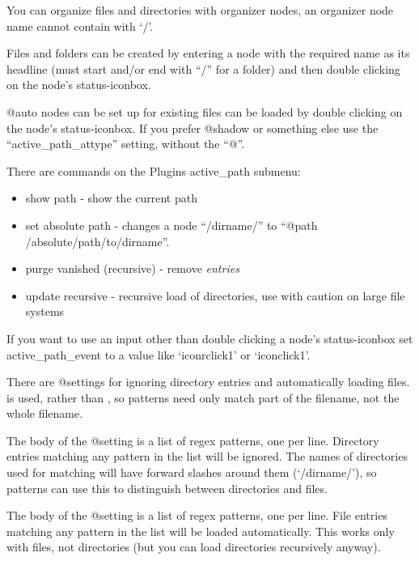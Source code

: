 \documentclass[a4paper,10pt,english]{sphinxmanual}
\begin{document}
You can organize files and directories with organizer nodes, an organizer node
name cannot contain with `/'.

Files and folders can be created by entering a node with the required name as
its headline (must start and/or end with ``/'' for a folder) and then double
clicking on the node's status-iconbox.

@auto nodes can be set up for existing files can be loaded by
double clicking on the node's status-iconbox. If you prefer
@shadow or something else use the ``active\_path\_attype'' setting,
without the ``@''.

There are commands on the Plugins active\_path submenu:
\begin{itemize}
\item {} 
show path - show the current path

\item {} 
set absolute path - changes a node ``/dirname/'' to ``@path /absolute/path/to/dirname''.

\item {} 
purge vanished (recursive) - remove \emph{entries}

\item {} 
update recursive - recursive load of directories, use with caution on large
file systems

\end{itemize}

If you want to use an input other than double clicking a node's status-iconbox
set active\_path\_event to a value like `iconrclick1' or `iconclick1'.

There are @settings for ignoring directory entries and automatically loading files.   is used, rather than , so patterns need only match part of the filename, not the whole filename.

The body of the @setting  is a list of regex
patterns, one per line.  Directory entries matching any pattern in the list will be ignored.  The names of directories used for matching will have forward slashes around them (`/dirname/'), so patterns can use this to distinguish between directories and files.

The body of the @setting  is a list of regex
patterns, one per line.  File entries matching any pattern in the list will be loaded automatically.  This works only with files, not directories (but you can load directories recursively anyway).
\end{document}
